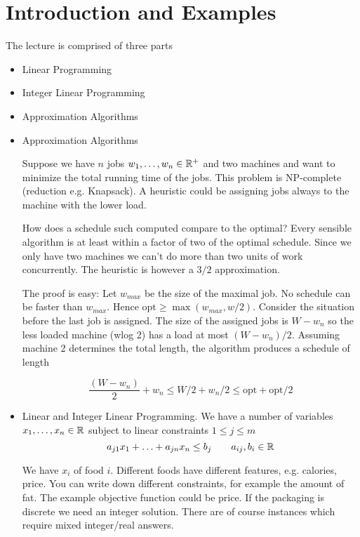 \section{Introduction and Examples}
The lecture is comprised of three parts

\begin{itemize}
\item Linear Programming
\item Integer Linear Programming
\item Approximation Algorithms
\end{itemize}

\begin{itemize}
\item Approximation Algorithms
\begin{Ex} Suppose we have $n$ jobs ${w}_1,\ldots,{w}_n\in \mathbb{R}^+$ and two machines and want to minimize the total running time of the jobs. This problem is NP-complete (reduction e.g. Knapsack). A heuristic could be assigning jobs always to the machine with the lower load.

How does a schedule such computed compare to the optimal? Every sensible algorithm is at least within a factor of two of the optimal schedule. Since we only have two machines we can't do more than two units of work concurrently. The heuristic is however a $3/2$ approximation.

The proof is easy: Let $w_{max}$ be the size of the maximal job. No schedule can be faster than $w_{max}$. Hence $\mbox{opt} \geq \max (w_{max}, w/2)$. Consider the situation before the last job is assigned. The size of the assigned jobs is $W-w_n$ so the less loaded machine (wlog 2) has a load at most $(W-w_n)/2$. Assuming machine 2 determines the total length, the algorithm produces a schedule of length 

\[\frac{(W-w_n)}{2} + w_n \leq W/2+w_n/2 \leq \mbox{opt} + \mbox{opt}/2\]
\end{Ex}
\item Linear and Integer Linear Programming. We have a number of variables ${x}_1,\ldots,{x}_n\in \mathbb{R}$ subject to linear constraints $1\leq j\leq m$
\[a_{j1}x_1 + \ldots + a_{jn} x_n \leq b_j \qquad a_{ij},b_i \in \mathbb{R}\]

\begin{Ex} We have $x_i$ of food $i$. Different foods have different features, e.g. calories, price. You can write down different constraints, for example the amount of fat. The example objective function could be price. If the packaging is discrete we need an integer solution. There are of course instances which require mixed integer/real answers.
\end{Ex}


\end{itemize}
